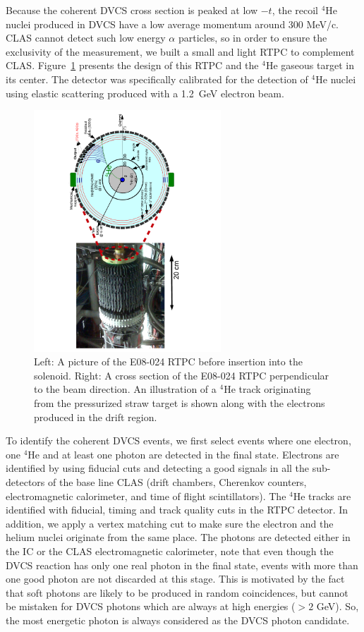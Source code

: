 \documentclass[nofootinbib,twocolumn,showpacs,prl,superscriptaddress,secnumarabic,amssymb,nobibnotes,aps,floatfix,preprint]{revtex4}
\begin{document}
Because the coherent DVCS cross section is peaked at low $-t$, the recoil 
$^4$He nuclei produced in DVCS have a low average momentum around 300 
MeV/c. CLAS cannot detect such low energy $\alpha$ particles, 
so in order to ensure the exclusivity of the measurement, we built a small and 
light RTPC to complement CLAS. Figure~\ref{fig:RTPC} presents the design of 
this RTPC and the $^4$He gaseous target in its center. The detector was 
specifically calibrated for the detection of
$^4$He nuclei using elastic scattering produced with a 1.2~GeV electron beam.


\begin{figure}[tb]
\vspace{-1.1cm}
\includegraphics[width=7.0cm,angle=-90]{figs/RTPC.pdf}
\vspace{-1.1cm}
\caption{Left: A picture of the E08-024 RTPC before insertion into the 
   solenoid. Right: A cross section of the E08-024 RTPC perpendicular to the 
   beam direction. An illustration of a $^4$He track originating from the 
   pressurized straw target is shown along with the electrons produced in the 
   drift region.}
\label{fig:RTPC}
\end{figure}

To identify the coherent DVCS events, we first select events where one 
electron, one $^4$He and at least one photon are detected in the final state. 
Electrons are identified by using fiducial cuts and detecting a good
signals in all the sub-detectors of the base line CLAS (drift chambers, 
Cherenkov counters, electromagnetic calorimeter, and time of flight 
scintillators). The $^4$He tracks are identified with fiducial, 
timing and track quality cuts in the RTPC detector. In addition,
we apply a vertex matching cut to make sure the electron and the helium
nuclei originate from the same place. The photons are detected either
in the IC or the CLAS electromagnetic calorimeter, note that even though the 
DVCS reaction has only one real photon in the final state, 
events with more than one good photon are not discarded at this stage. This is 
motivated by the fact that soft photons are likely to be produced in random 
coincidences, but cannot be mistaken for DVCS photons which are always at high
energies ($>2$ GeV). So, the most energetic photon is always considered as 
the DVCS photon candidate.
\end{document}
